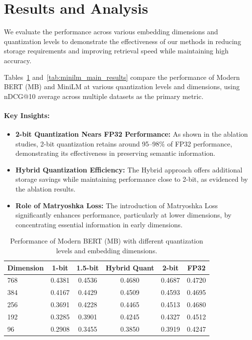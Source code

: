 \section{Results and Analysis}
\label{sec:results}
We evaluate the performance across various embedding dimensions and quantization levels to demonstrate the effectiveness of our methods in reducing storage requirements and improving retrieval speed while maintaining high accuracy.


Tables~\ref{tab:mb_main_results} and~\ref{tab:minilm_main_results} compare the performance of Modern BERT (MB) and MiniLM at various quantization levels and dimensions, using nDCG@10 average across multiple datasets as the primary metric. 
\paragraph{Key Insights:}
\begin{itemize}
    \item \textbf{2-bit Quantization Nears FP32 Performance:} As shown in the ablation studies, 2-bit quantization retains around 95--98\% of FP32 performance, demonstrating its effectiveness in preserving semantic information.
    \item \textbf{Hybrid Quantization Efficiency:} The Hybrid approach offers additional storage savings while maintaining performance close to 2-bit, as evidenced by the ablation results.
    \item \textbf{Role of Matryoshka Loss:} The introduction of Matryoshka Loss significantly enhances performance, particularly at lower dimensions, by concentrating essential information in early dimensions.
\end{itemize}

\begin{table}[ht]
\caption{Performance of Modern BERT (MB) with different quantization levels and embedding dimensions.}
\label{tab:mb_main_results}
\centering
\begin{tabular}{lccccc}
\toprule
\textbf{Dimension} & \textbf{1-bit} & \textbf{1.5-bit} & \textbf{Hybrid Quant} & \textbf{2-bit} & \textbf{FP32} \\
\midrule
768 & 0.4381 & 0.4536 & 0.4680 & 0.4687 & 0.4720 \\
384 & 0.4167 & 0.4429 & 0.4509 & 0.4593 & 0.4695 \\
256 & 0.3691 & 0.4228 & 0.4465 & 0.4513 & 0.4680 \\
192 & 0.3285 & 0.3901 & 0.4245 & 0.4327 & 0.4512 \\
96 & 0.2908 & 0.3455 & 0.3850 & 0.3919 & 0.4247 \\
\bottomrule
\end{tabular}
\end{table}

